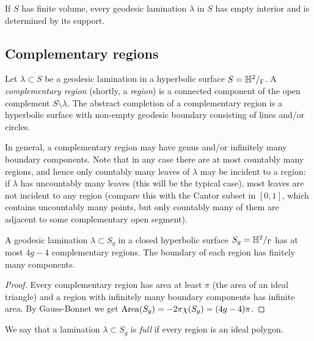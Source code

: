 \begin{cor}
If $S$ has finite volume, every geodesic lamination $\lambda$ in $S$ has empty interior and is determined by its support.
\end{cor}

\subsection{Complementary regions}
Let $\lambda \subset S$ be a geodesic lamination in a hyperbolic surface $S=\mathbb{H}^2/_\Gamma$.
A \emph{complementary region} (shortly, a \emph{region}) is a connected component of the open complement $S\setminus \lambda$. The abstract completion of a complementary region is a hyperbolic surface with non-empty geodesic boundary consisting of lines and/or circles. 

In general, a complementary region may have genus and/or infinitely many boundary components. Note that in any case there are at most countably many regions, and hence only countably many leaves of $\lambda$ may be incident to a region: if $\lambda$ has uncountably many leaves (this will be the typical case), most leaves are not incident to any region (compare this with the Cantor subset in $[0,1]$, which contains uncountably many points, but only countably many of them are adjacent to some complementary open segment).

\begin{prop} \label{finite:regions:prop}
A geodesic lamination $\lambda\subset S_g$ in a closed hyperbolic surface $S_g=\mathbb{H}^2/_\Gamma$ has at most $4g-4$ complementary regions. The boundary of each region has finitely many components.
\end{prop}
\begin{proof}
Every complementary region has area at least $\pi$ (the area of an ideal triangle) and a region with infinitely many boundary components has infinite area. By Gauss-Bonnet we get ${\rm Area}(S_g) = -2\pi\chi(S_g) = (4g-4)\pi$.
\end{proof}

We say that a lamination $\lambda \subset S_g$ is \emph{full} if every region is an ideal polygon.


